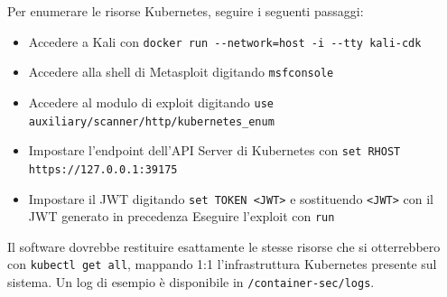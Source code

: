 Per enumerare le risorse Kubernetes, seguire i seguenti passaggi:

\begin{itemize}
    \item Accedere a Kali con {\small \verb|docker run --network=host -i --tty kali-cdk|}
    \item Accedere alla shell di Metasploit digitando {\small \verb|msfconsole|}
    \item Accedere al modulo di exploit digitando {\small \verb|use auxiliary/scanner/http/kubernetes_enum|}
    \item Impostare l'endpoint dell'API Server di Kubernetes con {\small \verb|set RHOST https://127.0.0.1:39175|}
    \item Impostare il JWT digitando {\small \verb|set TOKEN <JWT>|} e sostituendo {\small \verb|<JWT>|} con il JWT generato in precedenza
    Eseguire l'exploit con {\small \verb|run|}
\end{itemize}

Il software dovrebbe restituire esattamente le stesse risorse che si otterrebbero con {\small \verb|kubectl get all|}, mappando 1:1 l'infrastruttura Kubernetes presente sul sistema. Un log di esempio è disponibile in {\small \verb|/container-sec/logs|}.


